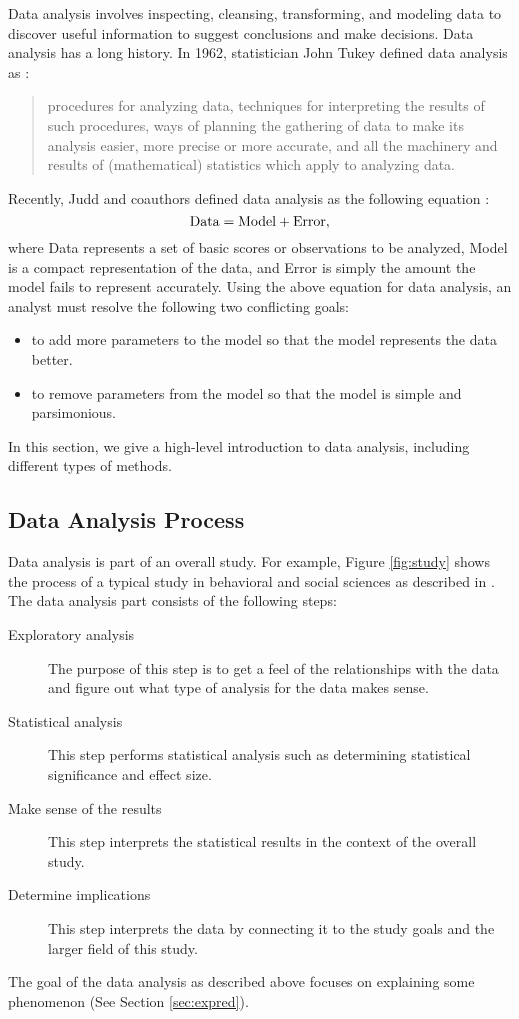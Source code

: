 \documentclass[12pt]{article}
\begin{document}


Data analysis involves inspecting, cleansing, transforming, and modeling data to discover useful information to suggest conclusions and make decisions. Data analysis has a long history. In 1962, statistician John Tukey defined data analysis as \citep{tukey1962data}: 
\begin{quote}
procedures for analyzing data,  techniques for interpreting the results of such procedures, ways of planning the  gathering of data to make its analysis easier, more precise or more accurate, and  all the machinery and results of (mathematical) statistics which apply to analyzing data.
\end{quote}
Recently, Judd and coauthors defined data analysis as the following equation \citep{judd2017}:
\begin{equation}\label{eq:judd}
\hbox{Data} = \hbox{Model} + \hbox{Error},
\end{equation}
where Data represents a set of basic scores or observations to be analyzed, Model is a compact representation of the data, and Error is simply the amount the model fails to represent accurately. Using the above equation for data analysis, an analyst must resolve the following two conflicting goals:
\begin{itemize}
\item to add more parameters to the model so that the model represents the data better.
\item to remove parameters from the model so that the model is simple and parsimonious.
\end{itemize}

In this section, we give a high-level introduction to data analysis, including different types of methods.

\subsection{Data Analysis Process}\label{sec:process}

Data analysis is part of an overall study. For example, Figure \ref{fig:study} shows the process of a typical study in behavioral and social sciences as described in \citep{albers2017}. The data analysis part consists of the following steps:
\begin{description}
\item[Exploratory analysis] The purpose of this step is to get a feel of the relationships with the data and figure out what type of analysis for the data makes sense.
\item[Statistical analysis] This step performs statistical analysis such as determining statistical significance and effect size. 
\item[Make sense of the results] This step interprets the statistical results in the context of the overall study.
\item[Determine implications] This step interprets the data by connecting it to the study goals and the larger field of this study.
\end{description}
The goal of the data analysis as described above focuses on explaining some phenomenon (See Section \ref{sec:expred}). 
\end{document}
